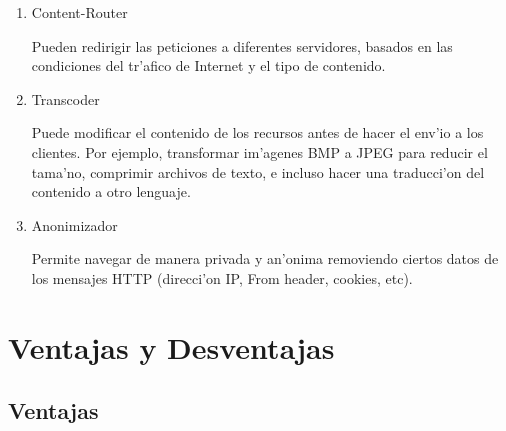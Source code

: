 \begin{enumerate}
\item Content-Router

Pueden redirigir las peticiones a diferentes servidores, basados en las condiciones del tr'afico de Internet y el tipo de contenido.

\item Transcoder

Puede modificar el contenido de los recursos antes de hacer el env'io a los clientes. Por ejemplo, transformar im'agenes BMP a JPEG para reducir el tama'no, comprimir archivos de texto, e incluso hacer una traducci'on del contenido a otro lenguaje.

\item Anonimizador

Permite navegar de manera privada y an'onima removiendo ciertos datos de los mensajes HTTP (direcci'on IP, From header, cookies, etc).

\end{enumerate}

\section{Ventajas y Desventajas}

\subsection{Ventajas}

